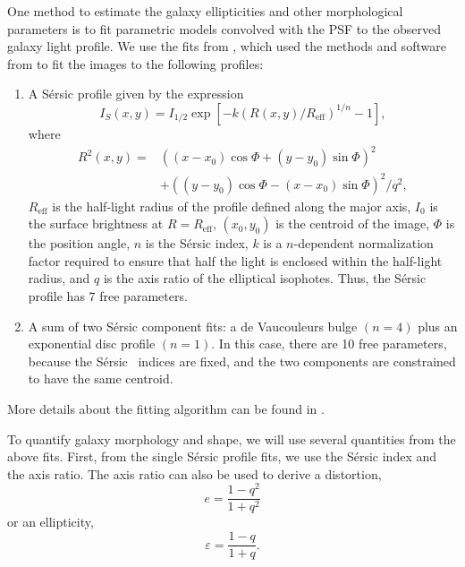 \documentclass[twocolumn,useAMS,usenatbib]{mn2e}
\newcommand{\sersic}{S\'{e}rsic }
\begin{document}
One method to estimate the galaxy ellipticities and other
morphological parameters is to fit parametric models convolved with
the PSF to the observed galaxy light profile.  We use the fits from
\cite{great3}, which used the methods and
software from \cite{Claire_Fits} to fit the images to the following profiles:
\begin{enumerate}
 \item A \sersic profile given by the expression 
       \begin{equation} 
    I_S(x,y) = I_{1/2}\exp{\left[ -k(R(x,y)/R_{\text{eff}})^{1/n} -1 \right]},
       \end{equation}
where \begin{align*} R^2(x,y) = & ((x-x_0)\cos\Phi+(y-y_0)\sin\Phi)^2
  \\ & + ((y-y_0)\cos\Phi-(x-x_0)\sin\Phi)^2/q^2, \end{align*}
$R_{\text{eff}}$ is the half-light radius of the profile defined along
the major axis, $I_0$ is the surface brightness at $R=R_{\text{eff}}$, $(x_0,y_0)$ is the centroid of the image,
$\Phi$ is the position angle, $n$ is the \sersic index, $k$ is a
$n$-dependent normalization factor required to ensure that half the
light is enclosed within the half-light radius, and $q$ is the axis
ratio of the elliptical isophotes.
Thus, the \sersic profile has 7 free parameters.
       \item A sum of two \sersic component fits: a de Vaucouleurs
         bulge $(n=4)$ plus an exponential disc profile $(n=1)$.  In this
         case, there are 10 free parameters, because the \sersic\
         indices are fixed, and the two components are constrained to
         have the same centroid.
\end{enumerate}
More details about the fitting algorithm can be found
in \cite{Claire_Fits}.

To quantify galaxy morphology and shape, we will use several
quantities from the above fits.  First, from the single \sersic
profile fits, we use the \sersic index and the axis ratio.  The axis
ratio can also be used to derive a distortion,
\begin{equation}\label{eq:distortion}
e = \frac{1-q^2}{1+q^2}
\end{equation}
or an ellipticity,
\begin{equation}\label{eq:ellipticity}
\varepsilon = \frac{1-q}{1+q}.
\end{equation}
\end{document}
